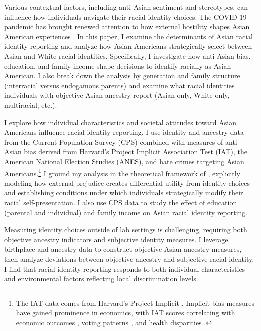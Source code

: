 \documentclass[12pt,english]{article}
\begin{document}
Various contextual factors, including anti-Asian sentiment and stereotypes, can influence how individuals navigate their racial identity choices. The COVID-19 pandemic has brought renewed attention to how external hostility shapes Asian American experiences \autocite{gover2020anti}. In this paper, I examine the determinants of Asian racial identity reporting and analyze how Asian Americans strategically select between Asian and White racial identities. Specifically, I investigate how anti-Asian bias, education, and family income shape decisions to identify racially as Asian American. I also break down the analysis by generation and family structure (interracial versus endogamous parents) and examine what racial identities individuals with objective Asian ancestry report (Asian only, White only, multiracial, etc.).

I explore how individual characteristics and societal attitudes toward Asian Americans influence racial identity reporting. I use identity and ancestry data from the Current Population Survey (CPS) combined with measures of anti-Asian bias derived from Harvard's Project Implicit Association Test (IAT), the American National Election Studies (ANES), and hate crimes targeting Asian Americans.\footnote{The IAT data comes from Harvard's Project Implicit \autocite{greenwaldMeasuringIndividualDifferences1998}. Implicit bias measures have gained prominence in economics, with IAT scores correlating with economic outcomes \autocite{chettyRaceEconomicOpportunity2020,gloverDiscriminationSelfFulfillingProphecy2017}, voting patterns \autocite{friesePredictingVotingBehavior2007}, and health disparities \autocite{leitnerRacialBiasAssociated2016}.} I ground my analysis in the theoretical framework of \textcite{akerlofEconomicsIdentity2000}, explicitly modeling how external prejudice creates differential utility from identity choices and establishing conditions under which individuals strategically modify their racial self-presentation. I also use CPS data to study the effect of education (parental and individual) and family income on Asian racial identity reporting.

Measuring identity choices outside of lab settings is challenging, requiring both objective ancestry indicators and subjective identity measures. I leverage birthplace and ancestry data to construct objective Asian ancestry measures, then analyze deviations between objective ancestry and subjective racial identity. I find that racial identity reporting responds to both individual characteristics and environmental factors reflecting local discrimination levels. 
\end{document}
